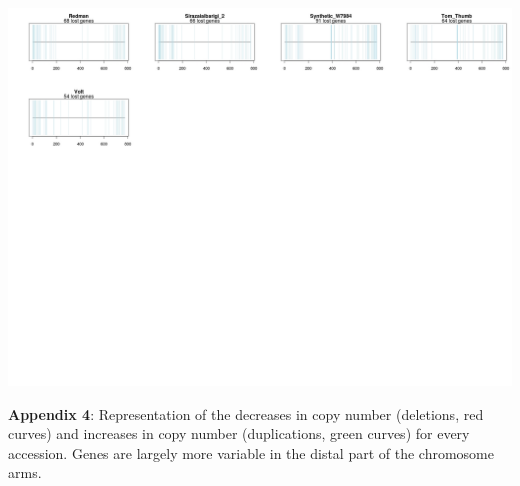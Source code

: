 \documentclass[a4paper, 12pt]{article}
\begin{document}
\centering \includegraphics[scale=0.28]{appendix/Appendix_4_3.jpg}

\newpage
\pagestyle{empty}
    \textbf{Appendix 4}: Representation of the decreases in copy number (deletions, red curves) and increases in copy number (duplications, green curves) for every accession. Genes are largely more variable in the distal part of the chromosome arms.
    
\vspace{1cm}
\end{document}
